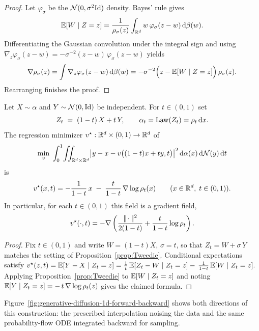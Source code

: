 \begin{proof}
Let $\varphi_\sigma$ be the $\mathcal{N}(0,\sigma^{2}\mathrm{Id})$ density. Bayes' rule gives
\[
\mathbb{E}[W\mid Z=z]
= \frac{1}{\rho_\sigma(z)}
      \int_{\mathbb{R}^{d}} w\,
             \varphi_\sigma(z-w)\,\mathrm{d}\beta(w).
\]
Differentiating the Gaussian convolution under the integral sign and using
$
\nabla_z\varphi_\sigma(z-w)
     = -\sigma^{-2}(z-w)\,\varphi_\sigma(z-w)
$
yields
\[
\nabla\rho_\sigma(z)
= \int \nabla_z\varphi_\sigma(z-w)\,\mathrm{d}\beta(w)
= -\sigma^{-2}\Bigl(z-\mathbb{E}[W\mid Z=z]\Bigr)\,\rho_\sigma(z).
\]
Rearranging finishes the proof.
\end{proof}


\begin{proposition}\label{prop:flow}
Let $X\sim\alpha$ and $Y\sim\mathcal{N}(0,\mathrm{Id})$ be independent.
For $t\in(0,1)$ set
\[
Z_t \;=\; (1-t)\,X + t\,Y,
\qquad
\alpha_t =\operatorname{Law}(Z_t)=\rho_t\,\mathrm{d} x.
\]
The regression minimizer $v^\star:\mathbb{R}^d\times(0,1)\to\mathbb{R}^d$ of
\[
\min_{v}\;\int_{0}^{1}\!
         \iint_{\mathbb{R}^{d}\times\mathbb{R}^{d}}
              \bigl|y-x-v\bigl((1-t)x+t y,t\bigr)\bigr|^{2}\,
              \mathrm{d}\alpha(x)\,\mathrm{d}\mathcal{N}(y)\,\mathrm{d} t
\]
is
\[
v^\star(x,t)
= -\frac{1}{1-t}\,x \;-\; \frac{t}{1-t}\,\nabla\log\rho_t(x)
\qquad (x\in\mathbb{R}^{d},\;t\in(0,1)).
\]
In particular, for each $t\in(0,1)$ this field is a gradient field,
\[
	v^\star(\cdot,t)=-\nabla
		\left(
			\frac{|\!| \cdot |\!|^2}{2(1-t)}
			+\frac{t}{1-t}\log\rho_t
		\right).
\]
\end{proposition}

\begin{proof}
Fix $t\in(0,1)$ and write $W=(1-t)X$, $\sigma=t$, so that
$Z_t = W + \sigma\,Y$ matches the setting of Proposition~\ref{prop:Tweedie}.
Conditional expectations satisfy
$
v^\star(z,t)
= \mathbb{E}[Y-X\mid Z_t=z]
= \frac{1}{t}\,\mathbb{E}[Z_t-W\mid Z_t=z]
  -\,\frac{1}{1-t}\,\mathbb{E}[W\mid Z_t=z].
$
Applying Proposition~\ref{prop:Tweedie} to $\mathbb{E}[W\mid Z_t=z]$ and
noting $\mathbb{E}[Y\mid Z_t=z]
      = -\,t\,\nabla\log\rho_t(z)$
gives the claimed formula.
\end{proof}

Figure~\ref{fig:generative-diffusion-1d-forward-backward} shows both directions of this construction: the prescribed interpolation noising the data and the same probability-flow ODE integrated backward for sampling.

